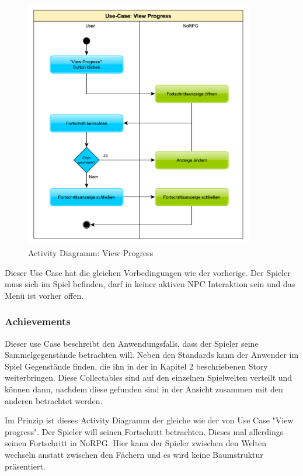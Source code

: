			\begin{figure}[htbp]
				\centering 
				\label{umlViewProgess}
				\includegraphics[width=10cm]{pics/ViewProgress.pdf}
				\caption{Activity Diagramm: View Progress}
			\end{figure}
	
			Dieser Use Case hat die gleichen Vorbedingungen wie der vorherige. Der Spieler muss sich im Spiel befinden, darf in keiner aktiven NPC Interaktion sein und das Menü ist vorher offen.
	
		\subsubsection{Achievements}
			Dieser use Case beschreibt den Anwendungsfalls, dass der Spieler seine Sammelgegenstände betrachten will. Neben den Standards kann der Anwender im Spiel Gegenstände finden, die ihn in der in Kapitel 2 beschriebenen Story weiterbringen. Diese Collectables sind auf den einzelnen Spielwelten verteilt und können dann, nachdem diese gefunden sind in der Ansicht zusammen mit den anderen betrachtet werden.
			
			Im Prinzip ist dieses Activity Diagramm der gleiche wie der von Use Case "View progress". Der Spieler will seinen Fortschritt betrachten. Dieses mal allerdings seinen Fortschritt in NoRPG. Hier kann der Spieler zwischen den Welten wechseln anstatt zwischen den Fächern und es wird keine Baumstruktur präsentiert.
			
